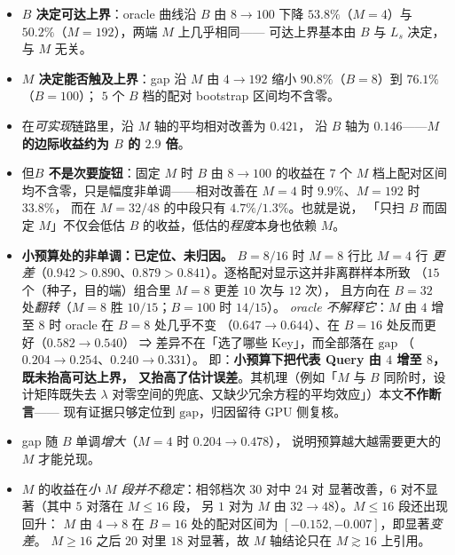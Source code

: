 \begin{itemize}
  \item \textbf{$B$ 决定可达上界}：oracle 曲线沿 $B$ 由 $8\to100$ 下降
        $53.8\%$（$M=4$）与 $50.2\%$（$M=192$），两端 $M$ 上几乎相同——
        可达上界基本由 $B$ 与 $L_s$ 决定，与 $M$ 无关。
  \item \textbf{$M$ 决定能否触及上界}：gap 沿 $M$ 由 $4\to192$ 缩小
        $90.8\%$（$B=8$）到 $76.1\%$（$B=100$）；
        $5$ 个 $B$ 档的配对 bootstrap 区间均不含零。
  \item 在\emph{可实现}链路里，沿 $M$ 轴的平均相对改善为 $0.421$，
        沿 $B$ 轴为 $0.146$——\textbf{$M$ 的边际收益约为 $B$ 的 $2.9$ 倍}。
  \item 但\textbf{$B$ 不是次要旋钮}：固定 $M$ 时 $B$ 由 $8\to100$ 的收益在
        $7$ 个 $M$ 档上配对区间均不含零，只是幅度非单调——相对改善在
        $M=4$ 时 $9.9\%$、$M=192$ 时 $33.8\%$，
        而在 $M=32/48$ 的中段只有 $4.7\%/1.3\%$。也就是说，
        「只扫 $B$ 而固定 $M$」不仅会低估 $B$ 的收益，低估的\emph{程度}本身也依赖 $M$。
  \item \textbf{小预算处的非单调：已定位、未归因。} $B=8/16$ 时 $M{=}8$ 行比 $M{=}4$ 行
        \emph{更差}（$0.942>0.890$、$0.879>0.841$）。逐格配对显示这并非离群样本所致
        （$15$ 个（种子，目的端）组合里 $M{=}8$ 更差 $10$ 次与 $12$ 次），
        且方向在 $B=32$ 处\emph{翻转}（$M{=}8$ 胜 $10/15$；$B=100$ 时 $14/15$）。
        \emph{oracle 不解释它}：$M$ 由 $4$ 增至 $8$ 时 oracle 在 $B=8$ 处几乎不变
        （$0.647\to0.644$）、在 $B=16$ 处反而更好（$0.582\to0.540$）
        ⇒ 差异不在「选了哪些 Key」，而全部落在 $\mathrm{gap}$
        （$0.204\to0.254$、$0.240\to0.331$）。
        即：\textbf{小预算下把代表 Query 由 $4$ 增至 $8$，既未抬高可达上界，
        又抬高了估计误差}。其机理（例如「$M$ 与 $B$ 同阶时，设计矩阵既失去
        $\lambda$ 对零空间的兜底、又缺少冗余方程的平均效应」）本文\textbf{不作断言}——
        现有证据只够定位到 $\mathrm{gap}$，归因留待 GPU 侧复核。
  \item gap 随 $B$ 单调\emph{增大}（$M=4$ 时 $0.204\to0.478$），
        说明预算越大越需要更大的 $M$ 才能兑现。
  \item $M$ 的收益在\emph{小 $M$ 段并不稳定}：相邻档次 $30$ 对中 $24$ 对
        显著改善，$6$ 对不显著（其中 $5$ 对落在 $M\le16$ 段，
        另 $1$ 对为 $M$ 由 $32\to48$）。$M\le16$ 段还出现回升：
        $M$ 由 $4\to8$ 在 $B=16$ 处的配对区间为 $[-0.152,-0.007]$，即显著\emph{变差}。
        $M\ge16$ 之后 $20$ 对里 $18$ 对显著，故 $M$ 轴结论只在
        $M\gtrsim16$ 上引用。
\end{itemize}


